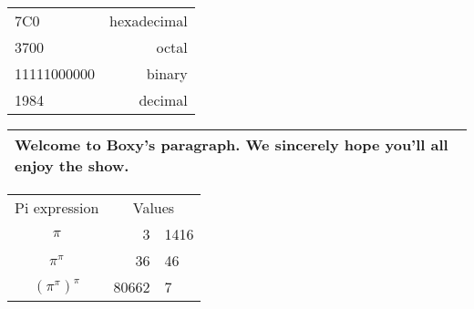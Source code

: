 \documentclass{ctexart}
\begin{document}
\begin{tabular}{|l|r|}
\hline
7C0 & hexadecimal \\
3700 & octal \\ \cline{2-2}
11111000000 & binary \\
\hline \hline
1984 & decimal \\
\hline
\end{tabular}

\begin{tabular}{|p{4.7cm}|}
\hline
Welcome to Boxy’s paragraph.
We sincerely hope you’ll
all enjoy the show. \\
\hline
\end{tabular}

  \begin{tabular}{|c r @{.} l|}
    \hline
    Pi expression      & \multicolumn{2}{c}{Values} \\
    $\pi$              & 3&1416 \\
    $\pi^{\pi}$        & 36&46 \\
    $(\pi^{\pi})^{\pi}$ & 80662&7 \\
    \hline
  \end{tabular}
\end{document}
